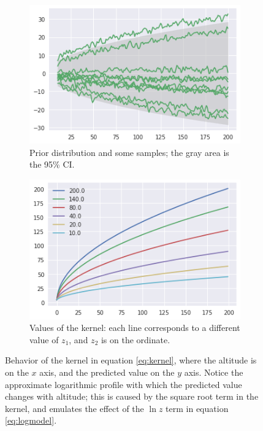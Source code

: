 \documentclass[a4paper,11pt]{kth-mag}
\begin{document}
\begin{figure}
    \centering
    \begin{subfigure}[t]{0.45\textwidth}
        \centering
        \includegraphics[width=\textwidth]{images/profile_kernel_prior}
        \caption{Prior distribution and some samples; the gray area is the 95\% CI.}
        \label{fig:kernel_prior}
    \end{subfigure}
    \hfill
    \begin{subfigure}[t]{0.45\textwidth}
        \centering
        \includegraphics[width=\textwidth]{images/kernel_values}
        \caption{Values of the kernel: each line corresponds to a different value of $z_1$, and $z_2$ is on the ordinate.}
        \label{fig:kernel_values}
    \end{subfigure}
    \caption{Behavior of the kernel in equation \ref{eq:kernel}, where the altitude is on the $x$ axis, and the predicted value on the $y$ axis. Notice the approximate logarithmic profile with which the predicted value changes with altitude; this is caused by the square root term in the kernel, and emulates the effect of the $\ln z$ term in equation \ref{eq:logmodel}.}
	\label{fig:kernel}
\end{figure}
\end{document}
